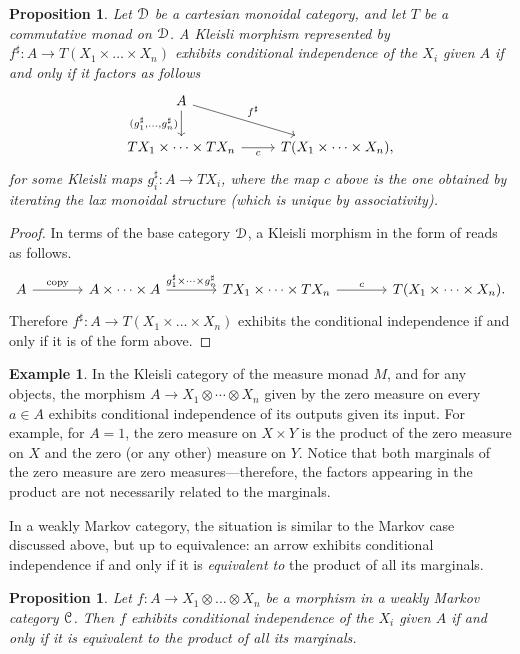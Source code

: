 \documentclass[a4paper,UKenglish,numberwithinsect,cleveref, autoref, thm-restate]{lipics-v2021}
\theoremstyle{plain} %
\newtheorem{myproposition}[mytheorem]{Proposition}
\theoremstyle{definition} %
\newtheorem{myexample}[mytheorem]{Example}
\begin{document}
\begin{myproposition}\label{indepkleisli}
 Let $\mathcal{D}$ be a cartesian monoidal category, and let $T$ be a commutative monad on $\mathcal{D}$.
 A Kleisli morphism represented by $f^\sharp:A\to T(X_1\times\dots\times X_n)$ exhibits conditional independence of the $X_i$ given $A$ if and only if it factors as follows
 \[
 \begin{tikzcd}
  A \ar{d}[swap]{(g_1^\sharp,\dots,g_n^\sharp)} \ar{dr}{f^\sharp} \\
  TX_1\times\dots\times TX_n \ar{r}[swap]{c} & T(X_1\times\dots\times X_n) ,
 \end{tikzcd}
 \]
 for some Kleisli maps $g_i^\sharp:A\to TX_i$,
 where the map $c$ above is the one obtained by iterating the lax monoidal structure (which is unique by associativity). 
\end{myproposition}
\begin{proof}
 In terms of the base category $\mathcal{D}$, a Kleisli morphism in the form of  reads as follows.
 \[
  \begin{tikzcd}[sep=large]
   A \ar{r}{\mathrm{copy}} & A\times\dots\times A \ar{r}{g_1^\sharp\times\dots\times g_n^\sharp} & TX_1\times\dots\times TX_n \ar{r}{c} & T(X_1\times\dots\times X_n) .
  \end{tikzcd}
 \]
 Therefore $f^\sharp:A\to T(X_1\times\dots\times X_n)$ exhibits the conditional independence if and only if it is of the form above.
\end{proof}

\begin{myexample}\label{zeromeasure}
	In the Kleisli category of the measure monad $M$, and for any objects, the morphism $A \to X_1 \otimes \cdots \otimes X_n$ given by the zero measure on every $a \in A$ exhibits conditional independence of its outputs given its input. For example, for $A=1$, the zero measure on $X\times Y$ is the product of the zero measure on $X$ and the zero (or any other) measure on $Y$.
 Notice that both marginals of the zero measure are zero measures---therefore, the factors appearing in the product are not necessarily related to the marginals.
\end{myexample}

In a weakly Markov category, the situation is similar to the Markov case discussed above,
but up to equivalence: an arrow exhibits conditional independence if and only if it is \emph{equivalent to} the product of all its marginals.

\begin{myproposition}\label{eqcondind}
 Let $f:A\to X_1\otimes\dots\otimes X_n$ be a morphism in a weakly Markov category $\mathcal{C}$. Then $f$ exhibits conditional independence of the $X_i$ given $A$ if and only if it is equivalent to the product of all its marginals.
\end{myproposition}
\end{document}

